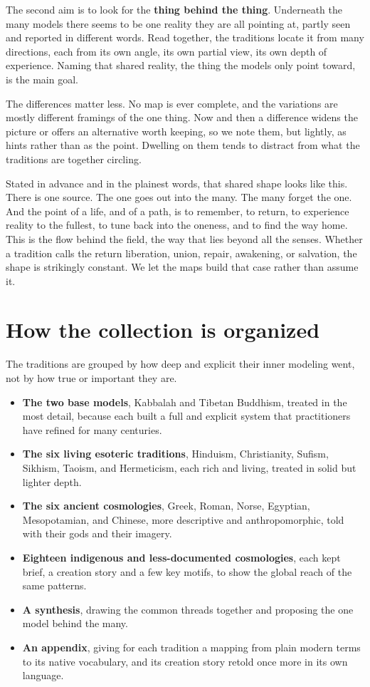 The second aim is to look for the \textbf{thing behind the thing}. Underneath the many models there seems to
be one reality they are all pointing at, partly seen and reported in different words. Read together, the
traditions locate it from many directions, each from its own angle, its own partial view, its own depth of
experience. Naming that shared reality, the thing the models only point toward, is the main goal.

The differences matter less. No map is ever complete, and the variations are mostly different framings of the
one thing. Now and then a difference widens the picture or offers an alternative worth keeping, so we note
them, but lightly, as hints rather than as the point. Dwelling on them tends to distract from what the
traditions are together circling.

Stated in advance and in the plainest words, that shared shape looks like this. There is one source. The one
goes out into the many. The many forget the one. And the point of a life, and of a path, is to remember, to
return, to experience reality to the fullest, to tune back into the oneness, and to find the way home. This is
the flow behind the field, the way that lies beyond all the senses. Whether a tradition calls the return
liberation, union, repair, awakening, or salvation, the shape is strikingly constant. We let the maps build
that case rather than assume it.

\section*{How the collection is organized}

The traditions are grouped by how deep and explicit their inner modeling went, not by how true or important
they are.

\begin{itemize}
 \item \textbf{The two base models}, Kabbalah and Tibetan Buddhism, treated in the most detail, because each
 built a full and explicit system that practitioners have refined for many centuries.
 \item \textbf{The six living esoteric traditions}, Hinduism, Christianity, Sufism, Sikhism,
 Taoism, and Hermeticism, each rich and living, treated in solid but lighter depth.
 \item \textbf{The six ancient cosmologies}, Greek, Roman, Norse, Egyptian, Mesopotamian, and Chinese, more
 descriptive and anthropomorphic, told with their gods and their imagery.
 \item \textbf{Eighteen indigenous and less-documented cosmologies}, each kept brief, a creation story and a
 few key motifs, to show the global reach of the same patterns.
 \item \textbf{A synthesis}, drawing the common threads together and proposing the one model behind the
 many.
 \item \textbf{An appendix}, giving for each tradition a mapping from plain modern terms to its native
 vocabulary, and its creation story retold once more in its own language.
\end{itemize}

